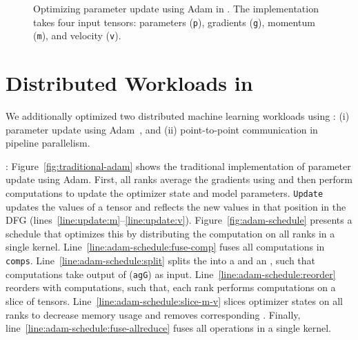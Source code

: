 \begin{figure}
  \caption{Optimizing parameter update using Adam in \tool. 
  The implementation takes four input tensors: parameters (\texttt{p}), gradients (\texttt{g}),
  momentum (\texttt{m}), and velocity (\texttt{v}).
  \label{fig:optimizing-adam}}
  \end{figure}

\section{Distributed Workloads in \tool}
\label{sec:opt-workloads}
We additionally optimized two distributed machine learning workloads using \tool: (i) parameter update using Adam~\cite{adam}, and (ii) point-to-point communication in pipeline parallelism.

: Figure~\ref{fig:traditional-adam} shows the traditional implementation of parameter update using Adam.
First, all ranks average the gradients using \allreduce and then perform computations to update the optimizer state and model parameters.
\texttt{Update} updates the values of a tensor and reflects the new values in that position in the DFG (lines~\ref{line:update:m}--\ref{line:update:v}).
Figure~\ref{fig:adam-schedule} presents a schedule that optimizes this by distributing the computation on all ranks in a single kernel.
Line~\ref{line:adam-schedule:fuse-comp} fuses all computations in \texttt{comps}.
Line~\ref{line:adam-schedule:split} splits the \allreduce into a \reducescatter and an \allgather, such that computations take output of \allgather (\texttt{agG}) as input.
Line~\ref{line:adam-schedule:reorder} reorders \allgather with computations, such that,
each rank performs computations on a slice of tensors.
Line~\ref{line:adam-schedule:slice-m-v} slices optimizer states on all ranks to decrease memory usage and removes corresponding \allgather.
Finally, line~\ref{line:adam-schedule:fuse-allreduce} fuses all operations in a single kernel.

